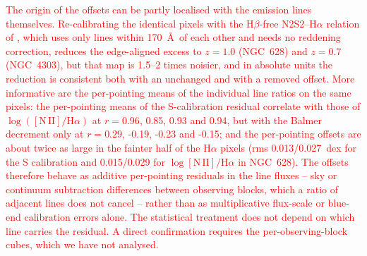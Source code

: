 \documentclass[fleqn,usenatbib]{mnras}
\newcommand{\revadd}[1]{\textcolor{red}{#1}}
\begin{document}
\revadd{The origin of the offsets can be partly localised with the emission lines themselves.  Re-calibrating the identical pixels with the H$\beta$-free N2S2--H$\alpha$ relation of \citet{Dopita2016}, which uses only lines within 170~\AA\ of each other and needs no reddening correction, reduces the edge-aligned excess to $z=1.0$ (NGC~628) and $z=0.7$ (NGC~4303), but that map is 1.5--2 times noisier, and in absolute units the reduction is consistent both with an unchanged and with a removed offset.  More informative are the per-pointing means of the individual line ratios on the same pixels: the per-pointing means of the S-calibration residual correlate with those of $\log([\mathrm{N\,II}]/\mathrm{H}\alpha)$ at $r=0.96$, 0.85, 0.93 and 0.94, but with the Balmer decrement only at $r=0.29$, -0.19, -0.23 and -0.15; and the per-pointing offsets are about twice as large in the fainter half of the H$\alpha$ pixels (rms 0.013/0.027~dex for the S calibration and 0.015/0.029 for $\log[\mathrm{N\,II}]/\mathrm{H}\alpha$ in NGC~628).  The offsets therefore behave as additive per-pointing residuals in the line fluxes -- sky or continuum subtraction differences between observing blocks, which a ratio of adjacent lines does not cancel -- rather than as multiplicative flux-scale or blue-end calibration errors alone.  The statistical treatment does not depend on which line carries the residual.  A direct confirmation requires the per-observing-block cubes, which we have not analysed.}
\end{document}
